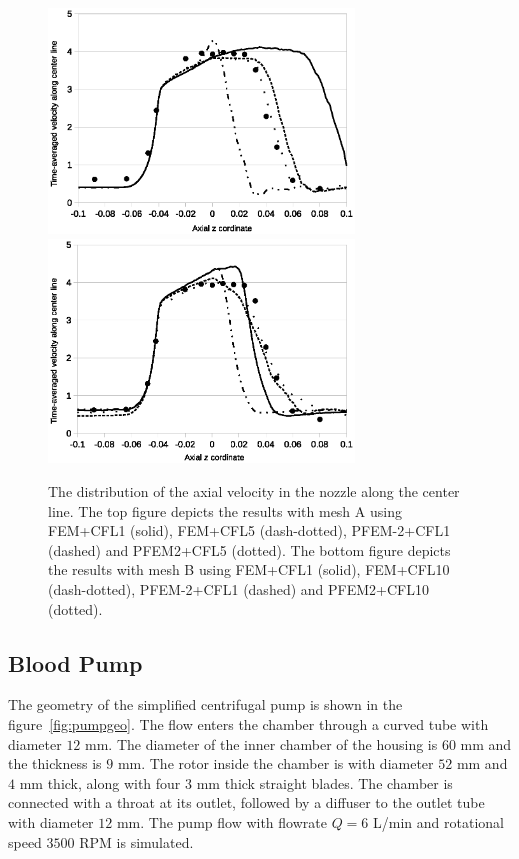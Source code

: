 \begin{figure}[htbp]
    \centering
    \includegraphics[width=3.2in]{imgs/nozzle_pump/nozzle_midvel_fm.eps}
    \includegraphics[width=3.2in]{imgs/nozzle_pump/nozzle_midvel_pm.eps}
    \caption{The distribution of the axial velocity in the nozzle along the center line. The top figure depicts the results with mesh A using FEM+CFL1 (solid), FEM+CFL5 (dash-dotted), PFEM-2+CFL1 (dashed) and PFEM2+CFL5 (dotted). The bottom figure depicts the results with mesh B using FEM+CFL1 (solid), FEM+CFL10 (dash-dotted), PFEM-2+CFL1 (dashed) and PFEM2+CFL10 (dotted). }
    \label{fig:nozzlemidvel}
\end{figure}

\subsection{Blood Pump}

The geometry of the simplified centrifugal pump is shown in the figure~\ref{fig:pumpgeo}. The flow enters the chamber through a curved tube with diameter $12$ mm. The diameter of the inner chamber of the housing is $60$ mm and the thickness is $9$ mm. The rotor inside the chamber is with diameter $52$ mm and $4$ mm thick, along with four $3$ mm thick straight blades. The chamber is connected with a throat at its outlet, followed by a diffuser to the outlet tube with diameter $12$ mm. The pump flow with flowrate $Q = 6$ L/min and rotational speed $3500$ RPM is simulated. 

